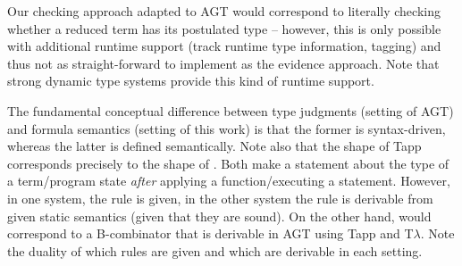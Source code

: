 Our checking approach adapted to AGT would correspond to literally checking whether a reduced term has its postulated type -- however, this is only possible with additional runtime support (track runtime type information, tagging) and thus not as straight-forward to implement as the evidence approach.
Note that strong dynamic type systems provide this kind of runtime support.

The fundamental conceptual difference between type judgments (setting of AGT) and formula semantics (setting of this work) is that the former is syntax-driven, whereas the latter is defined semantically.
Note also that the shape of Tapp corresponds precisely to the shape of .
Both make a statement about the type of a term/program state \emph{after} applying a function/executing a statement.
However, in one system, the rule is given, in the other system the rule is derivable from given static semantics (given that they are sound).
On the other hand,  would correspond to a B-combinator that is derivable in AGT using Tapp and T$\lambda$.
Note the duality of which rules are given and which are derivable in each setting.




